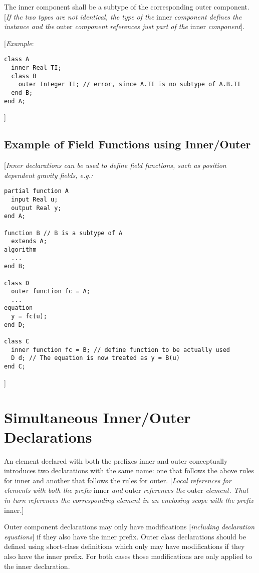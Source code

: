 The inner component shall be a subtype of the corresponding outer
component. {[}\emph{If the two types are not identical, the type of the}
inner \emph{component defines the instance and the} outer
\emph{component references just part of the} inner \emph{component}{]}.

{[}\emph{Example}:
\begin{lstlisting}[language=modelica]
class A
  inner Real TI;
  class B
    outer Integer TI; // error, since A.TI is no subtype of A.B.TI
  end B;
end A;
\end{lstlisting}

{]}

\subsection{Example of Field Functions using Inner/Outer}

{[}\emph{Inner declarations can be used to define field functions, such
as position dependent gravity fields, e.g.:}

\begin{lstlisting}[language=modelica]
partial function A
  input Real u;
  output Real y;
end A;

function B // B is a subtype of A
  extends A;
algorithm
  ...
end B;

class D
  outer function fc = A;
  ...
equation
  y = fc(u);
end D;

class C
  inner function fc = B; // define function to be actually used
  D d; // The equation is now treated as y = B(u)
end C;
\end{lstlisting}
{]}

\section{Simultaneous Inner/Outer Declarations}

An element declared with both the prefixes inner and outer conceptually
introduces two declarations with the same name: one that follows the
above rules for inner and another that follows the rules for outer.
{[}\emph{Local references for elements with both the prefix} inner
\emph{and} outer \emph{references the} outer \emph{element. That in turn
references the corresponding element in an enclosing scope with the
prefix} inner\emph{.}{]}

Outer component declarations may only have modifications
{[}\emph{including declaration equations}{]} if they also have the inner
prefix. Outer class declarations should be defined using short-class
definitions which only may have modifications if they also have the
inner prefix. For both cases those modifications are only applied to the
inner declaration.

